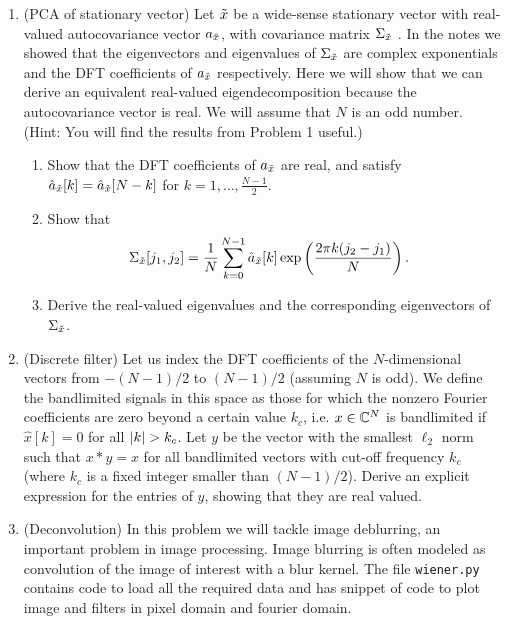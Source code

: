 \documentclass[12pt,twoside]{article}
\begin{document}
\begin{enumerate}
 \item (PCA of stationary vector) Let $\tilde{  x }$ be a wide-sense stationary vector with real-valued autocovariance vector $a_{\tilde{  x }}$,  with covariance matrix $\Sigma_{\tilde{  x }}$ . In the notes we showed that the eigenvectors and eigenvalues of $\Sigma_{\tilde{  x }}$ are complex exponentials and the DFT coefficients of $a_{\tilde{  x }}$ respectively. Here we will show that we can derive an equivalent real-valued eigendecomposition because the autocovariance vector is real. We will assume that $N$ is an odd number. (Hint: You will find the results from Problem 1 useful.)
 \begin{enumerate}
 \item Show that the DFT coefficients of $a_{\tilde{  x }}$ are real, and satisfy $\hat{a}_{\tilde{  x }}[k] = \hat{a}_{\tilde{  x }}[N-k]$ for $k=1,\ldots,\frac{N-1}{2}$.
 \item Show that
 \begin{align}
 \Sigma_{\tilde{  x }}[j_1,j_2] & = \frac{1}{N}\sum_{k=0}^{N-1} \hat{a}_{\tilde{  x }}[k] \exp\left( \frac{2 \pi k (j_2-j_1)}{N} \right).
 \end{align}  
  \item Derive the real-valued eigenvalues and the corresponding eigenvectors of $\Sigma_{\tilde{  x }}$.
  \end{enumerate}
 
 \item (Discrete filter) Let us index the DFT coefficients of the $N$-dimensional vectors from $-(N-1)/2$ to $(N-1)/2$ (assuming $N$ is odd). We define the bandlimited signals in this space as those for which the nonzero Fourier coefficients are zero beyond a certain value $k_c$, i.e. $x \in \mathbb{C}^{N}$ is bandlimited if $\hat{x}[k]=0$ for all $\lvert k\rvert>k_c$. Let $y$ be the vector with the smallest $\ell_2$ norm such that $x \ast y = x$ for all bandlimited vectors with cut-off frequency $k_c$ (where $k_c$ is a fixed integer smaller than $(N-1)/2$). Derive an explicit expression for the entries of $y$, showing that they are real valued.

 
  \item (Deconvolution) In this problem we will tackle image deblurring, an important problem in image processing. Image blurring is often modeled as convolution of the image of interest with a blur kernel.  The file \texttt{wiener.py} contains code to load all the required data and has snippet of code to plot image and filters in pixel domain and fourier domain. 
  

\end{enumerate}
\end{document}
